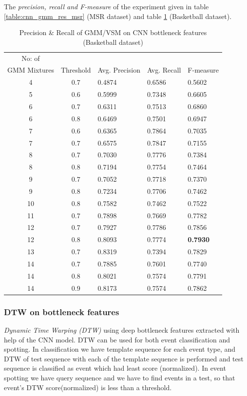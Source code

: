 The \textit{precision, recall and F-measure} of the experiment given in table \ref{table:cnn_gmm_res_msr} (MSR dataset) and table \ref{table:cnn_gmm_res_basket} (Basketball dataset).

\begin{table}[h]
\centering
\begin{tabular}{|c|c|l|l|l|}
\hline
No: of &&&&\\
GMM Mixtures & Threshold & Avg. Precision & Avg. Recall & F-measure\\
\hline
\hline
4 	&0.7 	&0.4874 	& 0.6586	&0.5602\\
5 	&0.6 	&0.5999 	& 0.7348	&0.6605\\
6 	&0.7 	&0.6311 	& 0.7513	&0.6860\\
6 	&0.8 	&0.6469 	& 0.7501	&0.6947\\
7 	&0.6 	&0.6365 	& 0.7864	&0.7035\\
7 	&0.7 	&0.6575 	& 0.7847	&0.7155\\
8 	&0.7 	&0.7030 	& 0.7776	&0.7384\\
8 	&0.8 	&0.7194 	& 0.7754	&0.7464\\
9 	&0.7 	&0.7052 	& 0.7718	&0.7370\\
9 	&0.8 	&0.7234 	& 0.7706	&0.7462\\
10 	&0.8 	&0.7582 	& 0.7462	&0.7522\\
11 	&0.7 	&0.7898 	& 0.7669	&0.7782\\
12 	&0.7 	&0.7927 	& 0.7786	&0.7856\\
12 	&0.8 	&0.8093 	& 0.7774	&\textbf{0.7930}\\
13 	&0.7 	&0.8319 	& 0.7394	&0.7829\\
14 	&0.7 	&0.7885 	& 0.7601	&0.7740\\
14 	&0.8 	&0.8021 	& 0.7574	&0.7791\\
14 	&0.9 	&0.8173 	& 0.7574	&0.7862\\
\hline  
\end{tabular}
\caption[Event spotting using GMM/VSM on CNN(Gray,Frame diff,Edge) bottleneck features (MSR Action Dataset) ]{ Precision \& Recall  of GMM/VSM on CNN bottleneck features (Basketball dataset)}
\label{table:cnn_gmm_res_basket}
\end{table}

\subsubsection{DTW on bottleneck features}
\textit{Dynamic Time Warping (DTW)} using deep bottleneck features extracted with help of the CNN model. DTW can be used for both event classification and spotting. In classification we have template sequence for each event type, and DTW of test sequence with each of the template sequence is performed and test sequence is classified as event which had least score (normalized). In event spotting we have query sequence and we have to find events in a test, so that event's DTW score(normalized) is less than a threshold.


